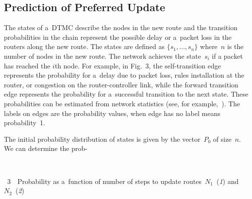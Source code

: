 \begin{multicols}{2}
\vspace*{-6pt}

\section{Prediction of Preferred Update}
\label{sec:dtmc}

\noindent
The states of a~DTMC describe the nodes in the new route and the transition 
probabilities in the chain represent the possible delay or 
a~packet loss in the routers along the new route. The
states are defined as 
$\{s_1, \ldots , s_n\}$ where~$n$ is the number
  of nodes in the new route. 
The network achieves the state~$s_i$ if a packet has reached the $i$th node. 
For example, in Fig.~3, the self-transition 
edge represents the probability for a~delay due to packet loss, rules installation 
at the router, or congestion on the router-controller link, while the 
forward transition edge represents the probability for 
a~successful transition to the next state. These probabilities can be estimated 
from network statistics (see, for example,~\cite{hogan_stochastic_2017}). 
The labels on edges are the probability values, when edge has no label
 means probability~1.
 
 The initial probability distribution of states is given by the vector~$P_0$ of size~$n$. 
We can determine the prob-\linebreak\vspace*{-12pt}
 

{ \begin{center}  %
\vspace*{-0.5pt}
  \mbox{%
 \epsfxsize=77.518mm 
 }


\end{center}

\vspace*{-3pt}

\noindent
{{\figurename~3}\ \ \small{Probability as a~function of number of steps to update routes~$N_1$~(\textit{1})
 and~$N_2$~(\textit{2})}}
}

\vspace*{12pt}




\end{multicols}
